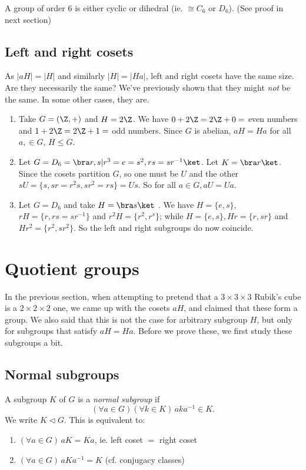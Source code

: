 \documentclass[a4paper]{article}
\begin{document}
\begin{prop}
  A group of order $6$ is either cyclic or dihedral (ie. $\cong C_6$ or $D_6$). (See proof in next section)
\end{prop}

\subsection{Left and right cosets}
As $|aH| = |H|$  and similarly $|H| = |Ha|$, left and right cosets have the same size. Are they necessarily the same? We've previously shown that they might \emph{not} be the same. In some other cases, they are.
\begin{eg}\leavevmode
  \begin{enumerate}
    \item Take $G = (\Z, +)$ and $H = 2\Z$. We have $0 + 2\Z = 2\Z + 0 = $ even numbers and $1 + 2\Z = 2\Z + 1 = $ odd numbers. Since $G$ is abelian, $aH = Ha$ for all $a, \in G$, $H\leq G$.
    \item Let $G = D_6 = \bra r, s | r^3 = e = s^2, rs = sr^{-1}\ket$. Let $K = \bra r\ket$. Since the cosets partition $G$, so one must be $U$ and the other $sU = \{s, sr = r^2s, sr^2 = rs\} = Us$. So for all $a\in G, aU = Ua$.
    \item Let $G = D_6$ and take $H = \bra s\ket$ . We have $H = \{e, s\}$, $rH = \{r, rs = sr^{-1}\}$ and $r^2 H = \{r^2, r^s\}$; while $H = \{e, s\}, Hr = \{r, sr\}$ and $Hr^2=\{r^2, sr^2\}$. So the left and right subgroups do now coincide.
  \end{enumerate}
\end{eg}

\section{Quotient groups}
In the previous section, when attempting to pretend that a $3\times 3\times 3$ Rubik's cube is a $2\times 2\times 2$ one, we came up with the cosets $aH$, and claimed that these form a group. We also said that this is not the case for arbitrary subgroup $H$, but only for subgroups that satisfy $aH = Ha$. Before we prove these, we first study these subgroups a bit.

\subsection{Normal subgroups}
\begin{defi}
  A subgroup $K$ of $G$ is a \emph{normal subgroup} if
  \[
    (\forall a\in G)(\forall k\in K)\,aka^{-1}\in K.
  \]
  We write $K\lhd G$. This is equivalent to:
  \begin{enumerate}
    \item $(\forall a\in G)\,aK = Ka$, ie. left coset $=$ right coset
    \item $(\forall a\in G)\,aKa^{-1} = K$ (cf. conjugacy classes)
  \end{enumerate}
\end{defi}
\end{document}
